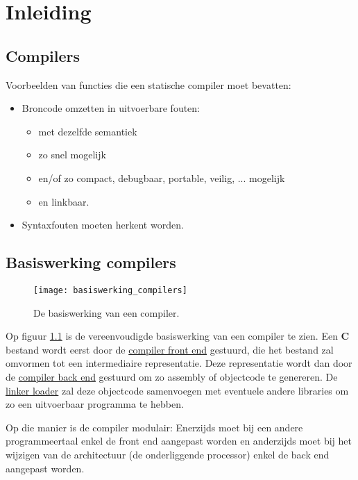 \chapter{Inleiding}
\section{Compilers}
Voorbeelden van functies die een statische compiler moet bevatten:
	\begin{itemize}
		\item Broncode omzetten in uitvoerbare fouten:
		\begin{itemize}
			\item met dezelfde semantiek
			\item zo snel mogelijk
			\item en/of zo compact, debugbaar, portable, veilig, ... mogelijk
			\item en linkbaar.
		\end{itemize}
		\item Syntaxfouten moeten herkent worden.
	\end{itemize}

\section{Basiswerking compilers}
\begin{figure}[h]
	\centering
	\texttt{[image: basiswerking\_compilers]}
	\caption{De basiswerking van een compiler.} 
	\label{fig:basiswerking_compilers}
\end{figure}
Op figuur \ref{fig:basiswerking_compilers} is de vereenvoudigde basiswerking van een compiler te zien. Een \textbf{C} bestand wordt eerst door de \uline{compiler front end} gestuurd, die het bestand zal omvormen tot een intermediaire representatie. Deze representatie wordt dan door de \uline{compiler back end} gestuurd om zo assembly of objectcode te genereren. De \uline{linker loader} zal deze objectcode samenvoegen met eventuele andere libraries om zo een uitvoerbaar programma te hebben. 

{Op die manier is de compiler modulair: Enerzijds moet bij een andere programmeertaal enkel de front end aangepast worden en anderzijds moet bij het wijzigen van de architectuur (de onderliggende processor) enkel de back end aangepast worden.}


